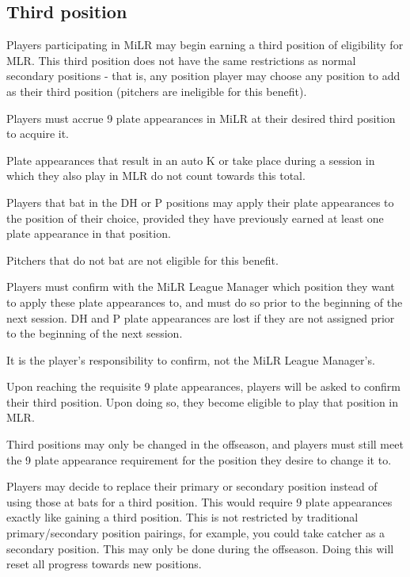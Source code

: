 \subsection{Third position}
\begin{deepEnumerate}
    \item Players participating in MiLR may begin earning a third position of eligibility for MLR. 
    This third position does not have the same restrictions as normal secondary positions - 
    that is, any position player may choose any position to add as their third position 
    (pitchers are ineligible for this benefit).
    \item Players must accrue 9 plate appearances in MiLR at their desired third position to acquire it.    
    \begin{deepEnumerate}
        \item Plate appearances that result in an auto K or take place during a session in which they also play in MLR do not count towards this total.
        \item Players that bat in the DH or P positions may apply their plate appearances to the position of their choice, 
        provided they have previously earned at least one plate appearance in that position.
        \begin{deepEnumerate}
            \item Pitchers that do not bat are not eligible for this benefit.
            \item Players must confirm with the MiLR League Manager which position they want to apply these plate appearances to, 
            and must do so prior to the beginning of the next session. 
            DH and P plate appearances are lost if they are not assigned prior to the beginning of the next session.
            \begin{deepEnumerate}
                \item It is the player’s responsibility to confirm, not the MiLR League Manager's.
            \end{deepEnumerate}
        \end{deepEnumerate}
        \item Upon reaching the requisite 9 plate appearances, players will be asked to confirm their third position. 
        Upon doing so, they become eligible to play that position in MLR.
    \end{deepEnumerate}
    \item Third positions may only be changed in the offseason, 
    and players must still meet the 9 plate appearance requirement for the position they desire to change it to.
    \item Players may decide to replace their primary or secondary position instead of using those at bats for a third position. 
    This would require 9 plate appearances exactly like gaining a third position. 
    This is not restricted by traditional primary/secondary position pairings, 
    for example, you could take catcher as a secondary position. 
    This may only be done during the offseason. 
    Doing this will reset all progress towards new positions.
\end{deepEnumerate}

